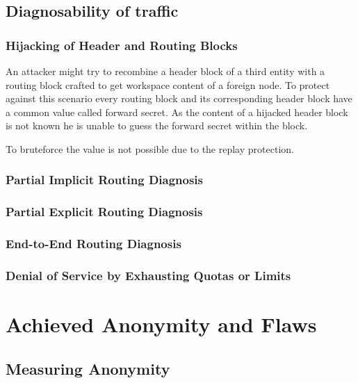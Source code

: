 \subsection{Diagnosability of traffic}

\subsubsection{Hijacking of Header and Routing Blocks}
An attacker might try to recombine a header block of a third entity with a routing block crafted to get workspace content of a foreign node. To protect against this scenario every routing block and its corresponding header block have a common value called forward secret. As the content of a hijacked header block is not known he is unable to guess the forward secret within the block.

To bruteforce the value is not possible due to the replay protection. 
\subsubsection{Partial Implicit Routing Diagnosis}

\subsubsection{Partial Explicit Routing Diagnosis}

\subsubsection{End-to-End Routing Diagnosis}

\subsubsection{Denial of Service by Exhausting Quotas or Limits}

\section{Achieved Anonymity and Flaws}
\subsection{Measuring Anonymity}

